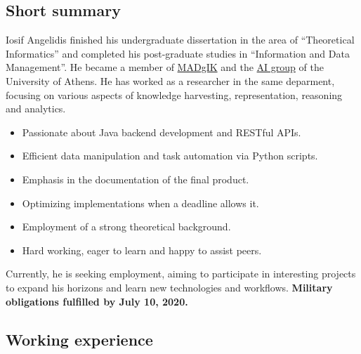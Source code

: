 \documentclass[a4paper,oneside,10pt]{article}
\begin{document}
\newpage

\subsection*{Short summary}

\begin{sloppypar}
	Iosif Angelidis finished his undergraduate 
	dissertation in the area of ``Theoretical Informatics'' and completed his post-graduate studies in ``Information and Data
	Management''. He became a member of \href{http://www.madgik.di.uoa.gr}{MADgIK} and the \href{http://ai.di.uoa.gr/}{AI group} of the University of Athens. He has worked as a researcher in the same deparment, focusing on various aspects of knowledge harvesting, representation, reasoning and analytics.
\end{sloppypar}

\begin{itemize}

	\item Passionate about Java backend development and RESTful APIs.

	\item Efficient data manipulation and task automation via Python scripts.

	\item Emphasis in the documentation of the final product.

	\item Optimizing implementations when a deadline allows it.

	\item Employment of a strong theoretical background.

	\item Hard working, eager to learn and happy to assist peers.

\end{itemize}


\begin{sloppypar}
	Currently, he is seeking employment, aiming to participate in interesting projects to expand his horizons and learn new technologies and workflows. \textbf{Military obligations fulfilled by July 10, 2020.}
\end{sloppypar}

\subsection*{Working experience}
\end{document}

